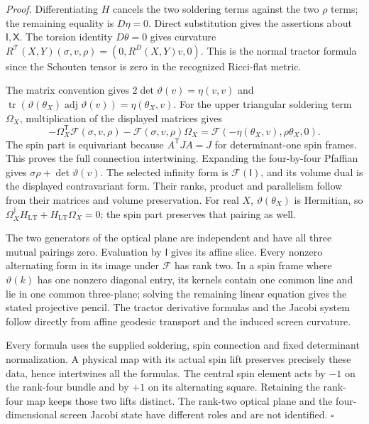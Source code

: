 \documentclass[
  english,
  11pt,
  reqno]{amsart}
\begin{document}
\emph{Proof.} Differentiating \(H\) cancels the two soldering terms
against the two \(\rho\) terms; the remaining equality is \(D\eta=0\).
Direct substitution gives the assertions about \(\mathsf I,\mathsf X\).
The torsion identity \(D\theta=0\) gives curvature
\(R^{\mathcal T}(X,Y)(\sigma,v,\rho)=(0,R^D(X,Y)v,0)\). This is the
normal tractor formula since the Schouten tensor is zero in the
recognized Ricci-flat metric.

The matrix convention gives \(2\det\vartheta(v)=\eta(v,v)\) and
\(\operatorname{tr}(\vartheta(\theta_X)\operatorname{adj}\vartheta(v))=\eta(\theta_X,v)\).
For the upper triangular soldering term \(\Omega_X\), multiplication of
the displayed matrices gives%
 \[
-\Omega_X^{\mathsf T}\mathcal F(\sigma,v,\rho)
-\mathcal F(\sigma,v,\rho)\Omega_X
=\mathcal F(-\eta(\theta_X,v),\rho\theta_X,0).
\] The spin part is equivariant because \(A^{\mathsf T}JA=J\) for
determinant-one spin frames. This proves the full connection
intertwining. Expanding the four-by-four Pfaffian gives
\(\sigma\rho+\det\vartheta(v)\). The selected infinity form is
\(\mathcal F(\mathsf I)\), and its volume dual is the displayed
contravariant form. Their ranks, product and parallelism follow from
their matrices and volume preservation. For real \(X\),
\(\vartheta(\theta_X)\) is Hermitian, so
\(\Omega_X^\dagger H_{\mathrm{LT}}+H_{\mathrm{LT}}\Omega_X=0\); the spin
part preserves that pairing as well.

The two generators of the optical plane are independent and have all
three mutual pairings zero. Evaluation by \(\mathsf I\) gives its affine
slice. Every nonzero alternating form in its image under \(\mathcal F\)
has rank two. In a spin frame where \(\vartheta(k)\) has one nonzero
diagonal entry, its kernels contain one common line and lie in one
common three-plane; solving the remaining linear equation gives the
stated projective pencil. The tractor derivative formulas and the Jacobi
system follow directly from affine geodesic transport and the induced
screen curvature.

Every formula uses the supplied soldering, spin connection and fixed
determinant normalization. A physical map with its actual spin lift
preserves precisely these data, hence intertwines all the formulas. The
central spin element acts by \(-1\) on the rank-four bundle and by
\(+1\) on its alternating square. Retaining the rank-four map keeps
those two lifts distinct. The rank-two optical plane and the
four-dimensional screen Jacobi state have different roles and are not
identified. \hfill\(\square\)
\end{document}
